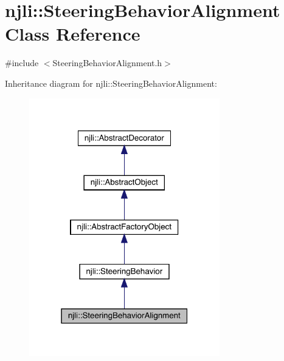 \hypertarget{classnjli_1_1_steering_behavior_alignment}{}\section{njli\+:\+:Steering\+Behavior\+Alignment Class Reference}
\label{classnjli_1_1_steering_behavior_alignment}


{\ttfamily \#include $<$Steering\+Behavior\+Alignment.\+h$>$}



Inheritance diagram for njli\+:\+:Steering\+Behavior\+Alignment\+:\nopagebreak
\begin{figure}[H]
\begin{center}
\leavevmode
\includegraphics[width=235pt]{classnjli_1_1_steering_behavior_alignment__inherit__graph}
\end{center}
\end{figure}


